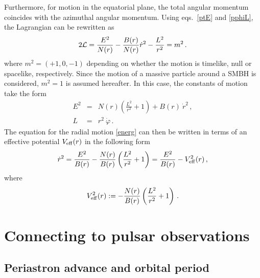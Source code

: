 \documentclass[a4paper,aps,twocolumn,showpacs,showkeys,nofootinbib,preprintnumbers,superscriptaddress,amsmath,amssymb,amsfonts]{revtex4-1}
\begin{document}
Furthermore, for motion in the equatorial plane, the total angular
momentum coincides with the azimuthal angular momentum.
Using eqs.~\eqref{ptE} and
\eqref{pphiL}, the Lagrangian can be rewritten as
\begin{equation}
2{\cal L} = \frac{E^2}{N(r)}-\frac{B(r)}{N(r)}{\dot r}^2-\frac{L^2}{r^2}= m^{2} \,.
\label{ep}
\end{equation}
%
where $m^{2}=(+1,0,-1)$ depending on whether the motion is timelike, null
or spacelike, respectively. Since the motion of a massive
particle around a SMBH is considered, $m^2=1$ is assumed hereafter. 
In this case, the constants of motion take the form
%
\begin{eqnarray}
E^2 &=& N(r) \left(\frac{L^2}{r^2}+1\right)+B(r) \ \! {\dot r}^2 \,, \label{energ} \\
L &=& r^2 \ \! {\dot \varphi} \,. \label{pphi}
\end{eqnarray}
%
The equation for the radial motion \eqref{energ} can then be written in
terms of an effective potential $V_{\rm eff}(r)$ in the following form
%
\begin{equation} 
\label{dotr1}
{\dot r}^2 = \frac{E^2}{B(r)}-\frac{N(r)}{B(r)}
\left(\frac{L^2}{r^2}+1\right) 
=\frac{E^2}{B(r)}-V^2_{\rm eff}(r) \,,
\end{equation}
%
where
%
\begin{equation} 
\label{eq:veff}
V^2_{\rm eff}(r) := -
\frac{N(r)}{B(r)} \left(\frac{L^2}{r^2}+1\right) \,.
\end{equation}

\section{Connecting to pulsar observations}
\label{cinque}

\subsection{Periastron advance and orbital period}
\label{cinque.uno}
\end{document}
